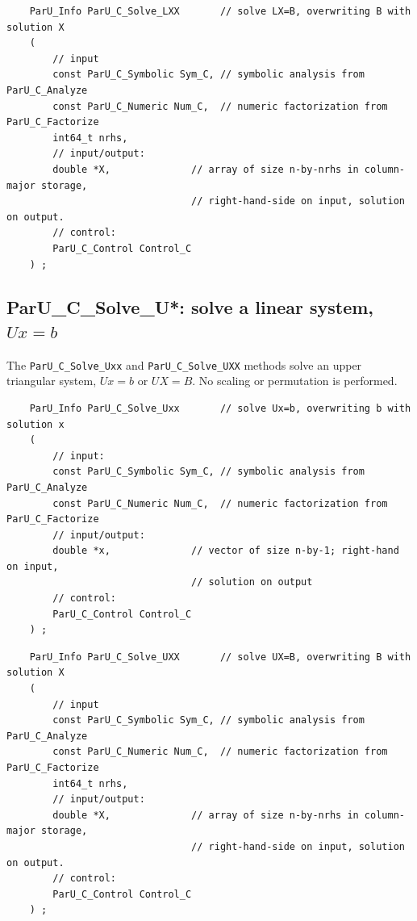\documentclass[12pt]{article}
\begin{document}
    {\footnotesize
    \begin{verbatim}
    ParU_Info ParU_C_Solve_LXX       // solve LX=B, overwriting B with solution X
    (
        // input
        const ParU_C_Symbolic Sym_C, // symbolic analysis from ParU_C_Analyze
        const ParU_C_Numeric Num_C,  // numeric factorization from ParU_C_Factorize
        int64_t nrhs,
        // input/output:
        double *X,              // array of size n-by-nrhs in column-major storage,
                                // right-hand-side on input, solution on output.
        // control:
        ParU_C_Control Control_C
    ) ; \end{verbatim} }

\subsection{{\sf ParU\_C\_Solve\_U*}: solve a linear system, $Ux=b$}

    The \verb'ParU_C_Solve_Uxx' and \verb'ParU_C_Solve_UXX' methods solve an
    upper triangular system, $Ux=b$ or $UX=B$.  No scaling or permutation is
    performed.

    {\footnotesize
    \begin{verbatim}
    ParU_Info ParU_C_Solve_Uxx       // solve Ux=b, overwriting b with solution x
    (
        // input:
        const ParU_C_Symbolic Sym_C, // symbolic analysis from ParU_C_Analyze
        const ParU_C_Numeric Num_C,  // numeric factorization from ParU_C_Factorize
        // input/output:
        double *x,              // vector of size n-by-1; right-hand on input,
                                // solution on output
        // control:
        ParU_C_Control Control_C
    ) ; \end{verbatim} }

    {\footnotesize
    \begin{verbatim}
    ParU_Info ParU_C_Solve_UXX       // solve UX=B, overwriting B with solution X
    (
        // input
        const ParU_C_Symbolic Sym_C, // symbolic analysis from ParU_C_Analyze
        const ParU_C_Numeric Num_C,  // numeric factorization from ParU_C_Factorize
        int64_t nrhs,
        // input/output:
        double *X,              // array of size n-by-nrhs in column-major storage,
                                // right-hand-side on input, solution on output.
        // control:
        ParU_C_Control Control_C
    ) ; \end{verbatim} }
\end{document}
